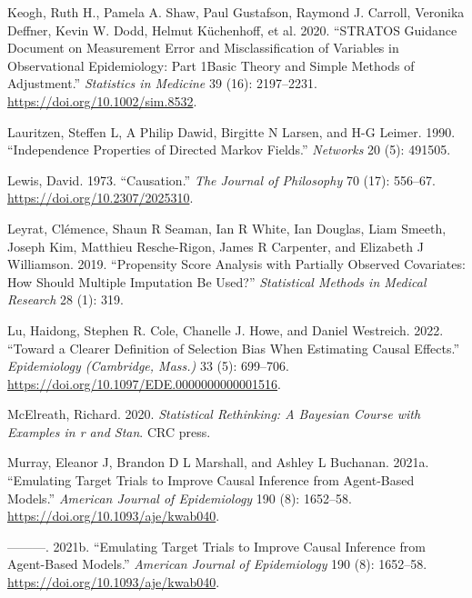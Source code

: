 \documentclass[
  singlecolumn]{article}
\newlength{\cslhangindent}
\newlength{\cslentryspacingunit} %
\newenvironment{CSLReferences}[2] %
 {%
  \setlength{\parindent}{0pt}
  \ifodd #1
  \let\oldpar\par
  \def\par{\hangindent=\cslhangindent\oldpar}
  \fi
  \setlength{\parskip}{#2\cslentryspacingunit}
 }%
 {}
\begin{document}
\begin{CSLReferences}{1}{0}
\leavevmode{}%
Keogh, Ruth H., Pamela A. Shaw, Paul Gustafson, Raymond J. Carroll,
Veronika Deffner, Kevin W. Dodd, Helmut Küchenhoff, et al. 2020.
{``STRATOS Guidance Document on Measurement Error and Misclassification
of Variables in Observational Epidemiology: Part 1{\textemdash}Basic
Theory and Simple Methods of Adjustment.''} \emph{Statistics in
Medicine} 39 (16): 2197--2231. \url{https://doi.org/10.1002/sim.8532}.

\leavevmode{}%
Lauritzen, Steffen L, A Philip Dawid, Birgitte N Larsen, and H-G Leimer.
1990. {``Independence Properties of Directed Markov Fields.''}
\emph{Networks} 20 (5): 491505.

\leavevmode{}%
Lewis, David. 1973. {``Causation.''} \emph{The Journal of Philosophy} 70
(17): 556--67. \url{https://doi.org/10.2307/2025310}.

\leavevmode{}%
Leyrat, Clémence, Shaun R Seaman, Ian R White, Ian Douglas, Liam Smeeth,
Joseph Kim, Matthieu Resche-Rigon, James R Carpenter, and Elizabeth J
Williamson. 2019. {``Propensity Score Analysis with Partially Observed
Covariates: How Should Multiple Imputation Be Used?''} \emph{Statistical
Methods in Medical Research} 28 (1): 319.

\leavevmode{}%
Lu, Haidong, Stephen R. Cole, Chanelle J. Howe, and Daniel Westreich.
2022. {``Toward a Clearer Definition of Selection Bias When Estimating
Causal Effects.''} \emph{Epidemiology (Cambridge, Mass.)} 33 (5):
699--706. \url{https://doi.org/10.1097/EDE.0000000000001516}.

\leavevmode{}%
McElreath, Richard. 2020. \emph{Statistical Rethinking: A Bayesian
Course with Examples in r and Stan}. CRC press.

\leavevmode{}%
Murray, Eleanor J, Brandon D L Marshall, and Ashley L Buchanan. 2021a.
{``Emulating Target Trials to Improve Causal Inference from Agent-Based
Models.''} \emph{American Journal of Epidemiology} 190 (8): 1652--58.
\url{https://doi.org/10.1093/aje/kwab040}.

\leavevmode{}%
---------. 2021b. {``Emulating Target Trials to Improve Causal Inference
from Agent-Based Models.''} \emph{American Journal of Epidemiology} 190
(8): 1652--58. \url{https://doi.org/10.1093/aje/kwab040}.


\end{CSLReferences}
\end{document}
